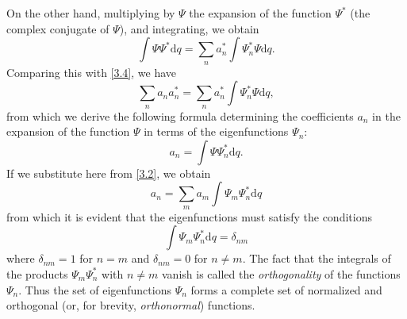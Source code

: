 On the other hand, multiplying by $ \Psi $ the expansion of the function $ \Psi^* $ (the complex conjugate of $ \Psi $), and integrating, we obtain
\[ \int\Psi\Psi^*\mathrm{d}q=\sum_{n}a_n^*\int\Psi_n^*\Psi\mathrm{d}q. \]
Comparing this with \eqref{3.4}, we have
\[ \sum_{n}a_na_n^*=\sum_{n}a_n^*\int\Psi_n^*\Psi\mathrm{d}q, \]
from which we derive the following formula determining the coefficients $ a_n $ in the expansion of the function $ \Psi $ in terms of the eigenfunctions $ \Psi_n $:
\begin{equation}\label{3.5}
a_n=\int\Psi\Psi_n^*\mathrm{d}q.
\end{equation}
If we substitute here from \eqref{3.2}, we obtain
\[ a_n=\sum_{m}a_m\int\Psi_m\Psi_n^*\mathrm{d}q \]
from which it is evident that the eigenfunctions must satisfy the conditions
\begin{equation}\label{3.6}
\int\Psi_m\Psi_n^*\mathrm{d}q=\delta_{nm}
\end{equation}
where $ \delta_{nm} = 1  $ for $  n = m $ and $ \delta_{nm} = 0  $ for $ n \ne m $. The fact that the integrals of the products $ \Psi_m\Psi_n^* $ with $ n \ne m $ vanish is called the \textit{orthogonality} of the functions $ \Psi_n $. Thus the set of eigenfunctions $ \Psi_n $ forms a complete set of normalized and orthogonal (or, for brevity, \textit{orthonormal}) functions.


